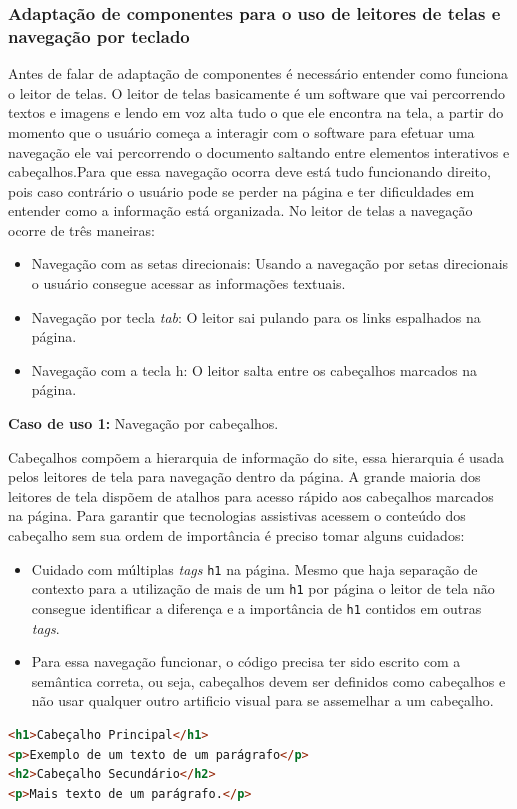 \subsubsection{Adaptação de componentes para o uso de leitores de telas e navegação por teclado}
{Antes de falar de adaptação de componentes é necessário entender como funciona o leitor de telas. O leitor de telas basicamente é um software que vai percorrendo textos e imagens e lendo em voz alta tudo o que ele encontra na tela, a partir do momento que o usuário começa a interagir com o software para efetuar uma navegação ele vai percorrendo o documento saltando entre elementos interativos e cabeçalhos.Para que essa navegação ocorra deve está tudo funcionando direito, pois caso contrário o usuário pode se perder na página e ter dificuldades em entender como a informação está organizada. No leitor de telas a navegação ocorre de três maneiras: 
\begin{itemize}
    \item Navegação com as setas direcionais: Usando a navegação por setas direcionais o usuário consegue acessar as informações textuais.
    \item Navegação por tecla \textit{tab}: O leitor sai pulando para os links espalhados na página.
    \item Navegação com a tecla h: O leitor salta entre os cabeçalhos marcados na página.
\end{itemize}

\newpage

{\textbf{Caso de uso 1:} Navegação por cabeçalhos.

Cabeçalhos compõem a hierarquia de informação do site, essa hierarquia é usada pelos leitores de tela para navegação dentro da página. A grande maioria dos leitores de tela dispõem de atalhos para acesso rápido aos cabeçalhos marcados na página. Para garantir que tecnologias assistivas acessem o conteúdo dos cabeçalho sem sua ordem de importância é preciso tomar alguns cuidados: 
\begin{itemize}
    \item Cuidado com múltiplas \textit{tags} \lstinline{h1} na página. Mesmo que haja separação de contexto para a utilização de mais de um \lstinline{h1} por página o leitor de tela não consegue identificar a diferença e a importância de \lstinline{h1} contidos em outras \textit{tags}.
    \item Para essa navegação funcionar, o código precisa ter sido escrito com a semântica correta, ou seja, cabeçalhos devem ser definidos como cabeçalhos e não usar qualquer outro artificio visual para se assemelhar a um cabeçalho. 
\end{itemize}
{\begin{lstlisting}[language=html,caption=cabeçalhos com hierarquia]
<h1>Cabeçalho Principal</h1>
<p>Exemplo de um texto de um parágrafo</p>
<h2>Cabeçalho Secundário</h2>
<p>Mais texto de um parágrafo.</p>
\end{lstlisting}}


}}
